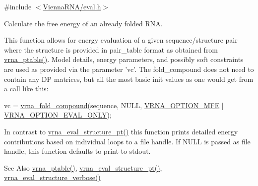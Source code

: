 {\ttfamily \#include $<$\hyperlink{eval_8h}{Vienna\-R\-N\-A/eval.\-h}$>$}



Calculate the free energy of an already folded R\-N\-A. 

This function allows for energy evaluation of a given sequence/structure pair where the structure is provided in pair\-\_\-table format as obtained from \hyperlink{group__struct__utils_gae829fb8bb7f694c12a9c0bbc34c77c60}{vrna\-\_\-ptable()}. Model details, energy parameters, and possibly soft constraints are used as provided via the parameter 'vc'. The fold\-\_\-compound does not need to contain any D\-P matrices, but all the most basic init values as one would get from a call like this\-: 
\begin{DoxyCode}
vc = \hyperlink{group__fold__compound_ga6601d994ba32b11511b36f68b08403be}{vrna\_fold\_compound}(sequence, NULL, \hyperlink{group__fold__compound_gae63be9127fe7dcc1f9bb14f5bb1064ee}{VRNA\_OPTION\_MFE} | 
      \hyperlink{group__fold__compound_ga61469c423131552c8483229f8b6c7e0e}{VRNA\_OPTION\_EVAL\_ONLY});
\end{DoxyCode}
 In contrast to \hyperlink{group__eval_gadbd09372ddfd7a450bbd590c96a6bfe4}{vrna\-\_\-eval\-\_\-structure\-\_\-pt()} this function prints detailed energy contributions based on individual loops to a file handle. If N\-U\-L\-L is passed as file handle, this function defaults to print to stdout.

\begin{DoxySeeAlso}{See Also}
\hyperlink{group__struct__utils_gae829fb8bb7f694c12a9c0bbc34c77c60}{vrna\-\_\-ptable()}, \hyperlink{group__eval_gadbd09372ddfd7a450bbd590c96a6bfe4}{vrna\-\_\-eval\-\_\-structure\-\_\-pt()}, \hyperlink{group__eval_ga0928d699d310178f84ee2351034e5cb5}{vrna\-\_\-eval\-\_\-structure\-\_\-verbose()}
\end{DoxySeeAlso}

